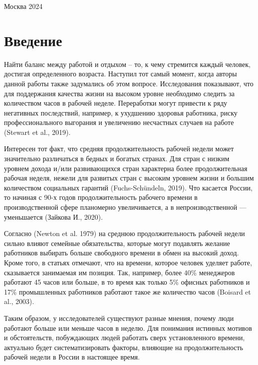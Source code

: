 \documentclass[12pt, a4paper]{article}
\begin{document}
\normalsize{ 
\hfill\break\hfill\break\hfill\break\hfill\break\hfill\break\hfill\break\hfill\break\hfill\break\hfill\break\hfill\break\hfill\break\hfill\break\hfill\break\hfill\break\hfill\break
\hfill \break
\hfill \break
\begin{center} Москва 2024 \end{center}
\thispagestyle{empty} %
 
\newpage
\section{Введение}

Найти баланс между работой и отдыхом – то, к чему стремится каждый человек, достигая определенного возраста. Наступил тот самый момент, когда авторы данной работы также задумались об этом вопросе. Исследования показывают, что для поддержания качества жизни на высоком уровне необходимо следить за количеством часов в рабочей неделе. Переработки могут привести к ряду негативных последствий, например, к ухудшению здоровья работника, риску профессионального выгорания и увеличению несчастных случаев на работе (Stewart et al., 2019).

Интересен тот факт, что средняя продолжительность рабочей недели может значительно различаться в бедных и богатых странах. Для стран с низким уровнем дохода и/или развивающихся стран характерна более продолжительная рабочая неделя, нежели для развитых стран с высоким уровнем жизни и большим количеством социальных гарантий (Fuchs-Schündeln, 2019). Что касается России, то начиная с 90-х годов продолжительность рабочего времени в производственной сфере планомерно увеличивается, а в непроизводственной — уменьшается (Зайкова И., 2020).

Согласно (Newton et al. 1979) на среднюю продолжительность рабочей недели сильно влияют семейные обязательства, которые могут подавлять желание работников выбирать больше свободного времени в обмен на высокий доход. Кроме того, в статьях отмечают, что на времени, которое человек уделяет работе, сказывается занимаемая им позиция. Так, например, более 40\% менеджеров работают 45 часов или больше, в то время как только 5\% офисных работников и 17\% промышленных работников работают такое же количество часов (Boisard et al., 2003).

Таким образом, у исследователей существуют разные мнения, почему люди работают больше или меньше часов в неделю. Для понимания истинных мотивов и обстоятельств, побуждающих людей работать сверх установленного времени, актуально будет систематизировать факторы, влияющие на продолжительность рабочей недели в России в настоящее время.

}
\end{document}
